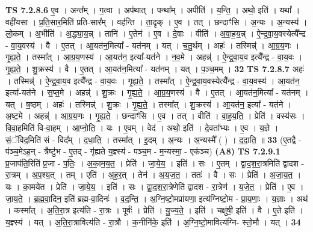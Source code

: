 \documentclass[17pt]{extarticle}
\begin{document}
                                \textbf{ TS 7.2.8.6} \newline
                  ए॒व । अन्त᳚म् । ग॒त्वा । अप॑थात् । पन्था᳚म् । अपीति॑ । य॒न्ति॒ । अथो॒ इति॑ । यथा᳚ । वही॑यसा । प्र॒ति॒सार॒मिति॑ प्रति-सार᳚म् । वह॑न्ति । ता॒दृक् । ए॒व । तत् । छन्दाꣳ॑सि । अ॒न्यः । अ॒न्यस्य॑ । लो॒कम् । अ॒भीति॑ । अ॒द्ध्या॒य॒न्न् । तानि॑ । ए॒तेन॑ । ए॒व । दे॒वाः । वीति॑ । अ॒वा॒ह॒य॒न्न् । ऐ॒न्द्र॒वा॒य॒वस्येत्यै᳚न्द्र - वा॒य॒वस्य॑ । वै । ए॒तत् । आ॒यत॑न॒मित्या᳚ - यत॑नम् । यत् । च॒तु॒र्थम् । अहः॑ । तस्मिन्न्॑ । आ॒ग्र॒य॒णः । गृ॒ह्य॒ते॒ । तस्मा᳚त् । आ॒ग्र॒य॒णस्य॑ । आ॒यत॑न॒ इत्या᳚-यत॑ने । न॒व॒मे । अहन्न्॑ । ऐ॒न्द्र॒वा॒य॒व इत्यै᳚न्द्र - वा॒य॒वः । गृ॒ह्य॒ते॒ । शु॒क्रस्य॑ । वै । ए॒तत् । आ॒यत॑न॒मित्या᳚ - यत॑नम् । यत् । प॒ञ्च॒मम् । \textbf{  32} \newline
                  \newline
                                \textbf{ TS 7.2.8.7} \newline
                  अहः॑ । तस्मिन्न्॑ । ऐ॒न्द्र॒वा॒य॒व इत्यै᳚न्द्र - वा॒य॒वः । गृ॒ह्य॒ते॒ । तस्मा᳚त् । ऐ॒न्द्र॒वा॒य॒वस्येत्यै᳚न्द्र - वा॒य॒वस्य॑ । आ॒यत॑न॒ इत्या᳚-यत॑ने । स॒प्त॒मे । अहन्न्॑ । शु॒क्रः । गृ॒ह्य॒ते॒ । आ॒ग्र॒य॒णस्य॑ । वै । ए॒तत् । आ॒यत॑न॒मित्या᳚ - यत॑नम् । यत् । ष॒ष्ठम् । अहः॑ । तस्मिन्न्॑ । शु॒क्रः । गृ॒ह्य॒ते॒ । तस्मा᳚त् । शु॒क्रस्य॑ । आ॒यत॑न॒ इत्या᳚ - यत॑ने । अ॒ष्ट॒मे । अहन्न्॑ । आ॒ग्र॒य॒णः । गृ॒ह्य॒ते॒ । छन्दाꣳ॑सि । ए॒व । तत् । वीति॑ । वा॒ह॒य॒ति॒ । प्रेति॑ । वस्य॑सः । वि॒वा॒हमिति॑ वि-वा॒हम् । आ॒प्नो॒ति॒ । यः । ए॒वम् । वेद॑ । अथो॒ इति॑ । दे॒वता᳚भ्यः । ए॒व । य॒ज्ञे । सं॒ॅविद॒मिति॑ सं - विद᳚म् । द॒धा॒ति॒ । तस्मा᳚त् । इ॒दम् । अ॒न्यः । अ॒न्यस्मै᳚ ( ) । द॒दा॒ति॒ ॥ \textbf{  33 } \newline
                  \newline
                      (ए॒तद्वै - प॑ञ्च॒मेऽह॒न् - त्रैष्टु॑भ - ए॒तद् - गृ॑ह्यते य॒ज्ञ्स्य॑ - पञ्च॒म - म॒न्यस्मा॒ - एक॑ञ्च)  \textbf{(A8)} \newline \newline
                                \textbf{ TS 7.2.9.1} \newline
                  प्र॒जाप॑ति॒रिति॑ प्र॒जा - प॒तिः॒ । अ॒का॒म॒य॒त॒ । प्रेति॑ । जा॒ये॒य॒ । इति॑ । सः । ए॒तम् । द्वा॒द॒श॒रा॒त्रमिति॑ द्वादश - रा॒त्रम् । अ॒प॒श्य॒त् । तम् । एति॑ । अ॒ह॒र॒त् । तेन॑ । अ॒य॒ज॒त॒ । ततः॑ । वै । सः । प्रेति॑ । अ॒जा॒य॒त॒ । यः । का॒मये॑त । प्रेति॑ । जा॒ये॒य॒ । इति॑ । सः । द्वा॒द॒श॒रा॒त्रेणेति॑ द्वादश - रा॒त्रेण॑ । य॒जे॒त॒ । प्रेति॑ । ए॒व । जा॒य॒ते॒ । ब्र॒ह्म॒वा॒दिन॒ इति॑ ब्रह्म-वा॒दिनः॑ । व॒द॒न्ति॒ । अ॒ग्नि॒ष्टो॒मप्रा॑यणा॒ इत्य॑ग्निष्टो॒म - प्रा॒य॒णाः॒ । य॒ज्ञाः । अथ॑ । कस्मा᳚त् । अ॒ति॒रा॒त्र इत्य॑ति - रा॒त्रः । पूर्वः॑ । प्रेति॑ । यु॒ज्य॒ते॒ । इति॑ । चक्षु॑षी॒ इति॑ । वै । ए॒ते इति॑ । य॒ज्ञ्स्य॑ । यत् । अ॒ति॒रा॒त्रावित्य॑ति - रा॒त्रौ । क॒नीनि॑के॒ इति॑ । अ॒ग्नि॒ष्टो॒मावित्य॑ग्नि- स्तो॒मौ । यत् । \textbf{  34} \newline
\end{document}

